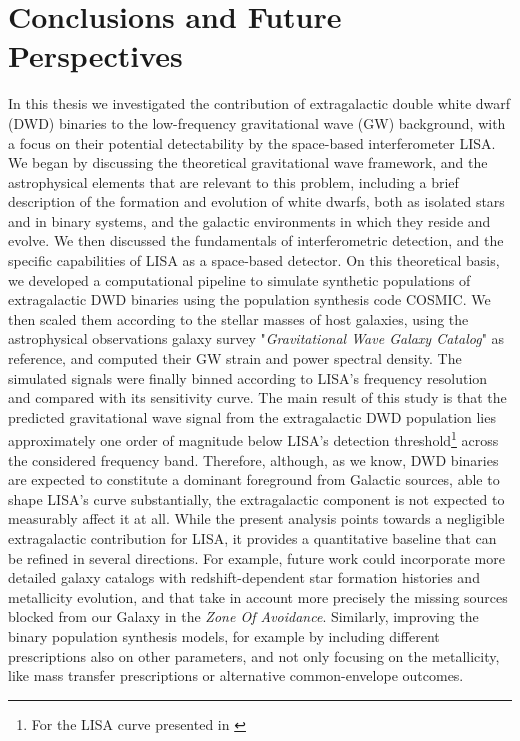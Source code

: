 \chapter*{Conclusions and Future Perspectives}
In this thesis we investigated the contribution of extragalactic double white dwarf (DWD) binaries to the low-frequency gravitational wave (GW) background, with a focus on their potential detectability by the space-based interferometer LISA.  
We began by discussing the theoretical gravitational wave framework, and the astrophysical elements that are relevant to this problem, including a brief description of the formation and evolution of white dwarfs, both as isolated stars and in binary systems, and the galactic environments in which they reside and evolve. 
We then discussed the fundamentals of interferometric detection, and the specific capabilities of LISA as a space-based detector.  
On this theoretical basis, we developed a computational pipeline to simulate synthetic populations of extragalactic DWD binaries using the population synthesis code COSMIC. 
We then scaled them according to the stellar masses of host galaxies, using the astrophysical observations galaxy survey "\textit{Gravitational Wave Galaxy Catalog}" as reference, and computed their GW strain and power spectral density. 
The simulated signals were finally binned according to LISA’s frequency resolution and compared with its sensitivity curve.
The main result of this study is that the predicted gravitational wave signal from the extragalactic DWD population lies approximately one order of magnitude below LISA’s detection threshold\footnote{For the LISA curve presented in \cite{Robson_2019}} across the considered frequency band.  
Therefore, although, as we know, DWD binaries are expected to constitute a dominant foreground from Galactic sources, able to shape LISA's curve substantially, the extragalactic component is not expected to measurably affect it at all.
While the present analysis points towards a negligible extragalactic contribution for LISA, it provides a quantitative baseline that can be refined in several directions.  
For example, future work could incorporate more detailed galaxy catalogs with redshift-dependent star formation histories and metallicity evolution, and that take in account more precisely the missing sources blocked from our Galaxy in the \textit{Zone Of Avoidance}.
Similarly, improving the binary population synthesis models, for example by including different prescriptions also on other parameters, and not only focusing on the metallicity, like mass transfer prescriptions or alternative common-envelope outcomes.
